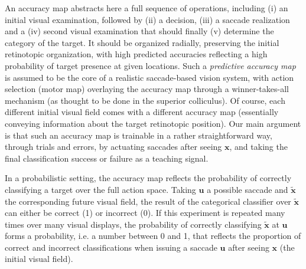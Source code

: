 An accuracy map abstracts here a full sequence of operations, including (i) an initial visual examination, followed by (ii) a decision, (iii) a saccade realization and a (iv) second visual examination that should finally (v) determine the category of the target. 
It should be organized radially, preserving the initial retinotopic organization, with high predicted accuracies reflecting a high probability of target presence at given locations. 
Such  a \emph{predictive accuracy map} is assumed to be the core of
a realistic saccade-based vision system, with action selection (motor map) overlaying the accuracy map through a winner-takes-all mechanism (as thought to be done in the superior colliculus). Of course, each different initial visual field comes with a different accuracy map (essentially conveying information about the target retinotopic position).
Our main argument is that such an accuracy map is trainable in a rather straightforward way, through trials and errors, by actuating saccades after seeing $\boldsymbol{x}$, and taking the final classification success or failure as a teaching signal. 
\fi

\CNS In a probabilistic setting, the accuracy map reflects the probability of correctly classifying a target over the full action space. Taking $\boldsymbol{u}$ a possible saccade and $\tilde{\boldsymbol{x}}$ the corresponding future visual field, the result of the categorical classifier over $\tilde{\boldsymbol{x}}$ can either be correct (1) or incorrect (0). If this experiment is repeated many times over many visual displays, the probability of correctly classifying $\tilde{\boldsymbol{x}}$ at $\boldsymbol{u}$ forms a probability, i.e. a number between 0 and 1, that reflects the proportion of correct and incorrect classifications when issuing a saccade $\boldsymbol{u}$ after seeing $\boldsymbol{x}$ (the initial visual field). 
\fi

